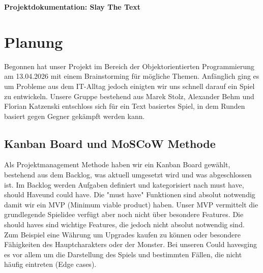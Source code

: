 \documentclass[12pt]{article}
\begin{document}
\vspace*{0.01cm}

\begin{center}
    \Large
    \textbf{Projektdokumentation: Slay The Text }
        
    \vspace{0.4cm}
    \large
   
       
\end{center}


\tableofcontents 
\vspace*{0.5cm}
\noindent 


\section{Planung}

Begonnen hat unser Projekt im Bereich der Objektorientierten Programmierung am 13.04.2026 mit einem Brainstorming für mögliche Themen. Anfänglich ging es um Probleme aus dem IT-Alltag jedoch einigten wir uns schnell darauf ein Spiel zu entwickeln. Unsere Gruppe bestehend aus Marek Stolz, Alexander Behm und Florian Katzenski entschloss sich für ein Text basiertes Spiel, in dem Runden basiert gegen Gegner gekämpft werden kann.



\subsection{Kanban Board und MoSCoW Methode}
Als Projektmanagement Methode haben wir ein Kanban Board gewählt, bestehend aus dem Backlog, was aktuell umgesetzt wird und was abgeschlossen ist. Im Backlog werden Aufgaben definiert und kategorisiert nach \glqq must have\grqq, \glqq should Have\grqq \space und \glqq could have\grqq. \newline \noindent Die "must have" Funktionen sind absolut notwendig damit wir ein MVP (Minimum viable product) haben. Unser MVP vermittelt die grundlegende Spielidee verfügt aber noch nicht über besondere Features. Die should haves sind wichtige Features, die jedoch nicht absolut notwendig sind. Zum Beispiel eine Währung um Upgrades kaufen zu können oder besondere Fähigkeiten des Hauptcharakters oder der Monster. Bei unseren \glqq Could haves\grqq \space ging es vor allem um die Darstellung des Spiels und bestimmten Fällen, die nicht häufig eintreten (\glqq Edge cases\grqq).
\end{document}
